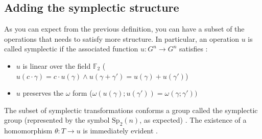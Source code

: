 \subsection{Adding the symplectic structure}

As you can expect from the previous definition, you can have a subset of the operations that needs to satisfy more structure. In particular, an operation $u$ is called symplectic if the associated function $u : G^n \to G^n$ satisfies \citep{Kitaev2002}:

\begin{itemize}
  \item $u$ is linear over the field $\mathbb{F}_2$ ($u(c \cdot \gamma) = c \cdot u(\gamma) \land u(\gamma + \gamma') = u(\gamma) + u(\gamma')$)
  \item $u$ preserves the $\omega$ form ($\omega(u(\gamma); u(\gamma')) = \omega(\gamma; \gamma'))$
\end{itemize}

The subset of symplectic transformations conforms a group called the symplectic group (represented by the symbol $\text{Sp}_2(n)$, as expected) \citep{Kitaev2002}. The existence of a homomorphism $\theta : T \to u$ is immediately evident \citep{Kitaev2002}.

